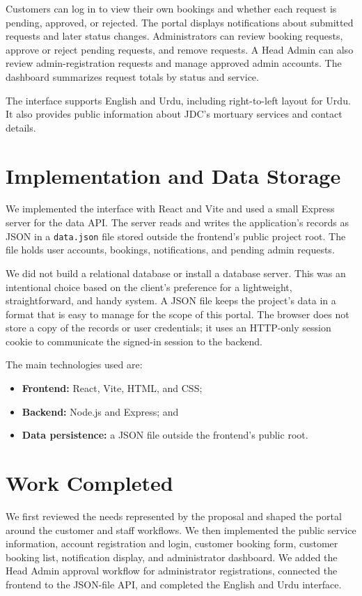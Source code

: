 \documentclass[12pt]{article}
\begin{document}
Customers can log in to view their own bookings and whether each request is pending, approved, or rejected. The portal displays notifications about submitted requests and later status changes. Administrators can review booking requests, approve or reject pending requests, and remove requests. A Head Admin can also review admin-registration requests and manage approved admin accounts. The dashboard summarizes request totals by status and service.

The interface supports English and Urdu, including right-to-left layout for Urdu. It also provides public information about JDC's mortuary services and contact details.

\section*{Implementation and Data Storage}
We implemented the interface with React and Vite and used a small Express server for the data API. The server reads and writes the application's records as JSON in a \texttt{data.json} file stored outside the frontend's public project root. The file holds user accounts, bookings, notifications, and pending admin requests.

We did not build a relational database or install a database server. This was an intentional choice based on the client's preference for a lightweight, straightforward, and handy system. A JSON file keeps the project's data in a format that is easy to manage for the scope of this portal. The browser does not store a copy of the records or user credentials; it uses an HTTP-only session cookie to communicate the signed-in session to the backend.

The main technologies used are:
\begin{itemize}[leftmargin=*]
  \item \textbf{Frontend:} React, Vite, HTML, and CSS;
  \item \textbf{Backend:} Node.js and Express; and
  \item \textbf{Data persistence:} a JSON file outside the frontend's public root.
\end{itemize}

\section*{Work Completed}
We first reviewed the needs represented by the proposal and shaped the portal around the customer and staff workflows. We then implemented the public service information, account registration and login, customer booking form, customer booking list, notification display, and administrator dashboard. We added the Head Admin approval workflow for administrator registrations, connected the frontend to the JSON-file API, and completed the English and Urdu interface.
\end{document}
